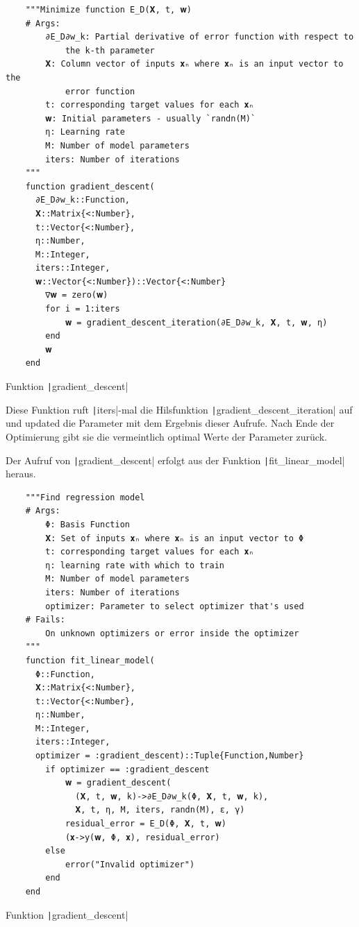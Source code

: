 \documentclass{article}
\theoremstyle{plain} %
\theoremstyle{definition} %
\begin{document}
\begin{listing}[H]
  \begin{verbatim} 
    """Minimize function E_D(𝐗, t, 𝐰)
    # Args:
        ∂E_D∂w_k: Partial derivative of error function with respect to
            the k-th parameter
        𝐗: Column vector of inputs 𝐱ₙ where 𝐱ₙ is an input vector to the
            error function
        t: corresponding target values for each 𝐱ₙ
        𝐰: Initial parameters - usually `randn(M)`
        η: Learning rate
        M: Number of model parameters
        iters: Number of iterations
    """
    function gradient_descent(
      ∂E_D∂w_k::Function,
      𝐗::Matrix{<:Number},
      t::Vector{<:Number},
      η::Number,
      M::Integer,
      iters::Integer,
      𝐰::Vector{<:Number})::Vector{<:Number}
        ∇𝐰 = zero(𝐰)
        for i = 1:iters
            𝐰 = gradient_descent_iteration(∂E_D∂w_k, 𝐗, t, 𝐰, η)
        end
        𝐰
    end
  \end{verbatim}
  \caption{Funktion \texttt|gradient_descent|}
  \label{listing:gd}
\end{listing}

Diese Funktion ruft \texttt|iters|-mal die Hilsfunktion \texttt|gradient_descent_iteration| auf und updated die Parameter mit dem Ergebnis dieser Aufrufe. Nach Ende der Optimierung gibt sie die vermeintlich optimal Werte der Parameter zurück. 

Der Aufruf von \texttt|gradient_descent| erfolgt aus der Funktion \texttt|fit_linear_model| heraus.

\begin{listing}[H]
  \begin{verbatim} 
    """Find regression model 
    # Args:
        Φ: Basis Function
        𝐗: Set of inputs 𝐱ₙ where 𝐱ₙ is an input vector to Φ
        t: corresponding target values for each 𝐱ₙ
        η: learning rate with which to train
        M: Number of model parameters
        iters: Number of iterations
        optimizer: Parameter to select optimizer that's used
    # Fails:
        On unknown optimizers or error inside the optimizer
    """
    function fit_linear_model(
      Φ::Function,
      𝐗::Matrix{<:Number},
      t::Vector{<:Number},
      η::Number,
      M::Integer,
      iters::Integer,
      optimizer = :gradient_descent)::Tuple{Function,Number}
        if optimizer == :gradient_descent
            𝐰 = gradient_descent(
              (𝐗, t, 𝐰, k)->∂E_D∂w_k(Φ, 𝐗, t, 𝐰, k),
              𝐗, t, η, M, iters, randn(M), ε, γ)
            residual_error = E_D(Φ, 𝐗, t, 𝐰)
            (𝐱->y(𝐰, Φ, 𝐱), residual_error)
        else
            error("Invalid optimizer")
        end
    end
  \end{verbatim}
  \caption{Funktion \texttt|gradient_descent|}
  \label{listing:gd}
\end{listing}
\end{document}
